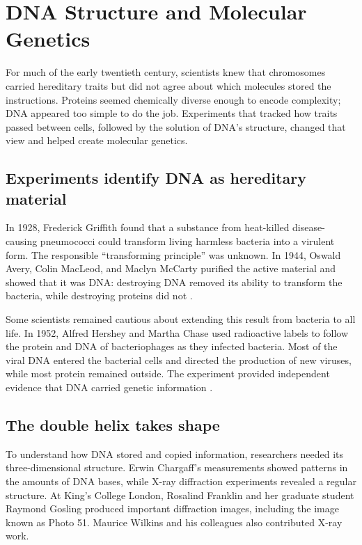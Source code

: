 \documentclass[12pt,oneside]{book}
\begin{document}
\chapter[DNA Structure and Molecular Genetics]{DNA Structure and Molecular Genetics}

For much of the early twentieth century, scientists knew that chromosomes
carried hereditary traits but did not agree about which molecules stored
the instructions. Proteins seemed chemically diverse enough to encode
complexity; DNA appeared too simple to do the job. Experiments that tracked
how traits passed between cells, followed by the solution of DNA's
structure, changed that view and helped create molecular genetics.

\section{Experiments identify DNA as hereditary material}
In 1928, Frederick Griffith found that a substance from heat-killed
disease-causing pneumococci could transform living harmless bacteria into
a virulent form. The responsible ``transforming principle'' was unknown.
In 1944, Oswald Avery, Colin MacLeod, and Maclyn McCarty purified the active
material and showed that it was DNA: destroying DNA removed its ability to
transform the bacteria, while destroying proteins did not
\cite{averyDNA1944}.

Some scientists remained cautious about extending this result from
bacteria to all life. In 1952, Alfred Hershey and Martha Chase used
radioactive labels to follow the protein and DNA of bacteriophages as they
infected bacteria. Most of the viral DNA entered the bacterial cells and
directed the production of new viruses, while most protein remained
outside. The experiment provided independent evidence that DNA carried
genetic information \cite{hersheyChase1952}.

\section{The double helix takes shape}
To understand how DNA stored and copied information, researchers needed
its three-dimensional structure. Erwin Chargaff's measurements showed
patterns in the amounts of DNA bases, while X-ray diffraction experiments
revealed a regular structure. At King's College London, Rosalind Franklin
and her graduate student Raymond Gosling produced important diffraction
images, including the image known as Photo 51. Maurice Wilkins and his
colleagues also contributed X-ray work.
\end{document}
